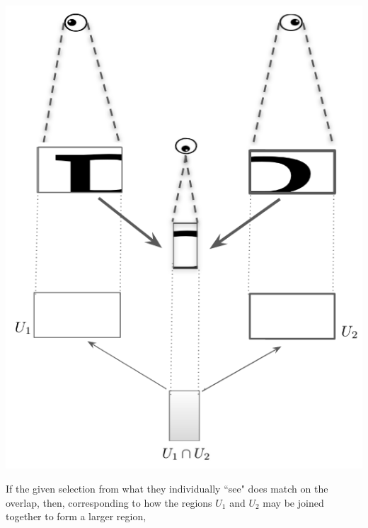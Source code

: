 \documentclass[11pt]{book}
\theoremstyle{definition}
\theoremstyle{definition}
\theoremstyle{definition}
\theoremstyle{theorem}
\theoremstyle{definition}
\begin{document}
	\begin{center}
		\includegraphics[scale=0.25]{3Diagram.png}
	\end{center}
	If the given selection from what they individually ``see" does match on the overlap, then, corresponding to how the regions $U_1$ and $U_2$ may be joined together to form a larger region, 
\end{document}
